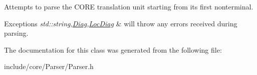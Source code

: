 Attempts to parse the C\+O\+RE translation unit starting from it\textquotesingle{}s first nonterminal.


\begin{DoxyExceptions}{Exceptions}
{\em std\+::string,\mbox{\hyperlink{class_diag}{Diag}},\mbox{\hyperlink{class_loc_diag}{Loc\+Diag}}} & will throw any errors received during parsing. \\
\hline
\end{DoxyExceptions}


The documentation for this class was generated from the following file\+:\begin{DoxyCompactItemize}
\item 
include/core/\+Parser/Parser.\+h\end{DoxyCompactItemize}
